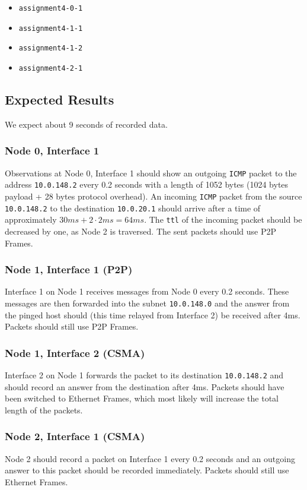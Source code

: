 \documentclass[parskip=full]{scrartcl}
\begin{document}
\begin{itemize}[noitemsep]
    \item \texttt{assignment4-0-1}
    \item \texttt{assignment4-1-1}
    \item \texttt{assignment4-1-2}
    \item \texttt{assignment4-2-1}
\end{itemize}

\subsection{Expected Results}
We expect about 9 seconds of recorded data. 
\subsubsection{Node 0, Interface 1}
Observations at Node 0, Interface 1 should show an outgoing \texttt{ICMP} packet to the address \texttt{10.0.148.2} every 0.2 seconds with a length of 1052 bytes (1024 bytes payload + 28 bytes protocol overhead).
An incoming \texttt{ICMP} packet from the source \texttt{10.0.148.2} to the destination \texttt{10.0.20.1} should arrive after a time of approximately $30ms + 2 \cdot 2ms = 64ms$.
The \texttt{ttl} of the incoming packet should be decreased by one, as Node 2 is traversed.
The sent packets should use P2P Frames. 

\subsubsection{Node 1, Interface 1 (P2P)}
Interface 1 on Node 1 receives messages from Node 0 every 0.2 seconds.
These messages are then forwarded into the subnet \texttt{10.0.148.0} and the answer from the pinged host should (this time relayed from Interface 2) be received after 4ms.
Packets should still use P2P Frames.
\subsubsection{Node 1, Interface 2 (CSMA)}
Interface 2 on Node 1 forwards the packet to its destination \texttt{10.0.148.2} and should record an answer from the destination after 4ms.
Packets should have been switched to Ethernet Frames, which most likely will increase the total length of the packets.
\subsubsection{Node 2, Interface 1 (CSMA)}
Node 2 should record a packet on Interface 1 every 0.2 seconds and an outgoing answer to this packet should be recorded immediately.
Packets should still use Ethernet Frames.
\end{document}
